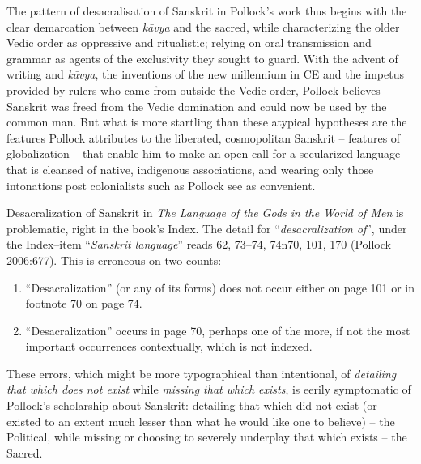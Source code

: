 The pattern of desacralisation of Sanskrit in Pollock’s work thus begins with the clear demarcation between \textit{kāvya} and the sacred, while characterizing the older Vedic order as oppressive and ritualistic; relying on oral transmission and grammar as agents of the exclusivity they sought to guard. With the advent of writing and \textit{kāvya}, the inventions of the new millennium in CE and the impetus provided by rulers who came from outside the Vedic order, Pollock believes Sanskrit was freed from the Vedic domination and could now be used by the common man. But what is more startling than these atypical hypotheses are the features Pollock attributes to the liberated, cosmopolitan Sanskrit – features of globalization – that enable him to make an open call for a secularized language that is cleansed of native, indigenous associations, and wearing only those intonations post colonialists such as Pollock see as convenient.

Desacralization of Sanskrit in \textit{The Language of the Gods in the World of Men} is problematic, right in the book’s Index. The detail for “\textit{desacralization of}”, under the Index–item “\textit{Sanskrit language}” reads 62, 73–74, 74n70, 101, 170 (Pollock 2006:677). This is erroneous on two counts:

\begin{enumerate}
\item “Desacralization” (or any of its forms) does not occur either on page 101 or in footnote 70 on page 74.

 \item “Desacralization” occurs in page 70, perhaps one of the more, if not the most important occurrences contextually, which is not indexed.

\end{enumerate}

These errors, which might be more typographical than intentional, of \textit{detailing that which does not exist} while \textit{missing that which exists}, is eerily symptomatic of Pollock’s scholarship about Sanskrit: detailing that which did not exist (or existed to an extent much lesser than what he would like one to believe) – the Political, while missing\textit{} or choosing to severely underplay that which exists – the Sacred.

